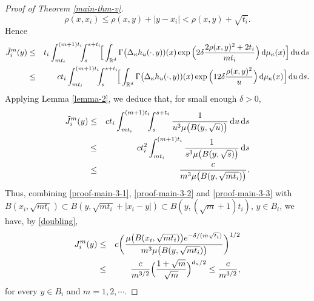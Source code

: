 \documentclass[11pt,a4paper]{article}
\def\R{\mathbb{R}}
\def\d{\textup{d}}
\theoremstyle{definition}\newtheorem{remark}[theorem]{Remark}
\begin{document}
\begin{proof}[Proof of Theorem \ref{main-thm-v}]
$$\rho(x,x_i)\leq\rho(x,y)+|y-x_i|<\rho(x,y)+\sqrt{t_i}.$$
Hence
\begin{eqnarray*}
\tilde{J}_i^m(y)&\leq&t_i\int_{mt_i}^{(m+1)t_i}\!\!\!\int_s^{s+t_i}\!\!\Big[ \int_{\R^d}\Gamma\big(\Delta_\kappa h_u(\cdot,y))(x)\exp\Big(2\delta\frac{2\rho(x,y)^2+2t_i}{mt_i}\Big)\,\d\mu_\kappa(x)\Big]\,\d u\,\d s\\
&\leq& c t_i\int_{mt_i}^{(m+1)t_i}\!\!\!\int_s^{s+t_i}\!\!\Big[ \int_{\R^d}\Gamma\big(\Delta_\kappa h_u(\cdot,y))(x)\exp\Big(12\delta\frac{\rho(x,y)^2}{u}\Big)\,\d\mu_\kappa(x)\Big]\,\d u\,\d s.
\end{eqnarray*}
Applying Lemma \ref{lemma-2}, we deduce that, for small enough $\delta>0$,
\begin{eqnarray}\label{proof-main-3-3}
\tilde{J}_i^m(y)&\leq& c t_i\int_{mt_i}^{(m+1)t_i}\!\!\!\int_s^{s+t_i} \frac{1}{u^3\mu\big(B(y,\sqrt{u})\big)}\,\d u\,\d s\cr
&\leq&c t_i^2\int_{mt_i}^{(m+1)t_i} \frac{1}{s^3\mu\big(B(y,\sqrt{s})\big)}\,\d s\cr
&\leq&\frac{c}{m^3\mu\big(B(y,\sqrt{mt_i})\big)}.
\end{eqnarray}
Thus, combining \eqref{proof-main-3-1}, \eqref{proof-main-3-2} and \eqref{proof-main-3-3} with $B(x_i,\sqrt{mt_i})\subset B(y,\sqrt{mt_i}+|x_i-y|)\subset B(y,(\sqrt{m}+1)t_i)$, $y\in B_i$, we have,  by \eqref{doubling},
\begin{eqnarray}\label{proof-main-3-4}
J_i^m(y)&\leq& c\bigg(\frac{\mu\big(B(x_i,\sqrt{mt_i})\big)e^{-\delta/(m\sqrt{t_i})}}{m^3\mu\big(B(y,\sqrt{mt_i})\big)}\bigg)^{1/2}\cr
&\leq&\frac{c}{m^{3/2}}\Big(\frac{1+\sqrt{m}}{\sqrt{m}}\Big)^{d_\kappa/2}\leq\frac{c}{m^{3/2}},
\end{eqnarray}
for every $y\in B_i$ and $m=1,2,\cdots.$


\end{proof}
\end{document}

